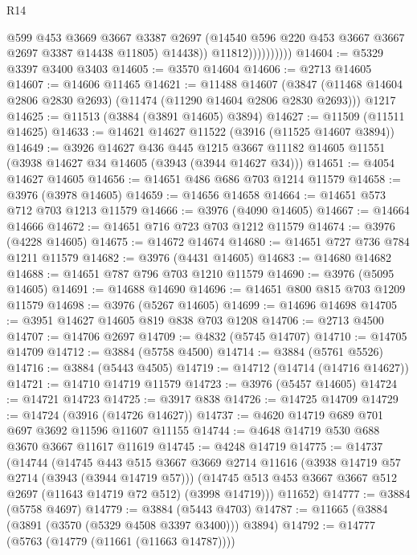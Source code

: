 \begin{lexlean}{R14}
\begin{coremodule}
                            @599
                            @453
                            @3669
                            @3667
                            @3387
                            @2697
                            (@14540 @596 @220 @453 @3667 @3667 @2697 @3387 @14438 @11805)
                            @14438))
                        @11812))))))))))
@14604 := @5329 @3397 @3400 @3403
@14605 := @3570 @14604
@14606 := @2713 @14605
@14607 := @14606 @11465
@14621 := @11488
    @14607
    (@3847 (@11468 @14604 @2806 @2830 @2693) (@11474 (@11290 @14604 @2806 @2830 @2693)))
    @1217
@14625 := @11513 (@3884 (@3891 @14605) @3894)
@14627 := @11509 (@11511 @14625)
@14633 := @14621 @14627 @11522 (@3916 (@11525 @14607 @3894))
@14649 := @3926
    @14627
    @436
    @445
    @1215
    @3667
    @11182
    @14605
    @11551
    (@3938 @14627 @34 @14605 (@3943 (@3944 @14627 @34)))
@14651 := @4054 @14627 @14605
@14656 := @14651 @486 @686 @703 @1214 @11579
@14658 := @3976 (@3978 @14605)
@14659 := @14656 @14658
@14664 := @14651 @573 @712 @703 @1213 @11579
@14666 := @3976 (@4090 @14605)
@14667 := @14664 @14666
@14672 := @14651 @716 @723 @703 @1212 @11579
@14674 := @3976 (@4228 @14605)
@14675 := @14672 @14674
@14680 := @14651 @727 @736 @784 @1211 @11579
@14682 := @3976 (@4431 @14605)
@14683 := @14680 @14682
@14688 := @14651 @787 @796 @703 @1210 @11579
@14690 := @3976 (@5095 @14605)
@14691 := @14688 @14690
@14696 := @14651 @800 @815 @703 @1209 @11579
@14698 := @3976 (@5267 @14605)
@14699 := @14696 @14698
@14705 := @3951 @14627 @14605 @819 @838 @703 @1208
@14706 := @2713 @4500
@14707 := @14706 @2697
@14709 := @4832 (@5745 @14707)
@14710 := @14705 @14709
@14712 := @3884 (@5758 @4500)
@14714 := @3884 (@5761 @5526)
@14716 := @3884 (@5443 @4505)
@14719 := @14712 (@14714 (@14716 @14627))
@14721 := @14710 @14719 @11579
@14723 := @3976 (@5457 @14605)
@14724 := @14721 @14723
@14725 := @3917 @838
@14726 := @14725 @14709
@14729 := @14724 (@3916 (@14726 @14627))
@14737 := @4620 @14719 @689 @701 @697 @3692 @11596 @11607 @11155
@14744 := @4648 @14719 @530 @688 @3670 @3667 @11617 @11619
@14745 := @4248 @14719
@14775 := @14737
    (@14744
      (@14745
        @443
        @515
        @3667
        @3669
        @2714
        @11616
        (@3938 @14719 @57 @2714 (@3943 (@3944 @14719 @57)))
        (@14745 @513 @453 @3667 @3667 @512 @2697 (@11643 @14719 @72 @512) (@3998 @14719)))
      @11652)
@14777 := @3884 (@5758 @4697)
@14779 := @3884 (@5443 @4703)
@14787 := @11665 (@3884 (@3891 (@3570 (@5329 @4508 @3397 @3400))) @3894)
@14792 := @14777 (@5763 (@14779 (@11661 (@11663 @14787))))

\end{coremodule}
\end{lexlean}
